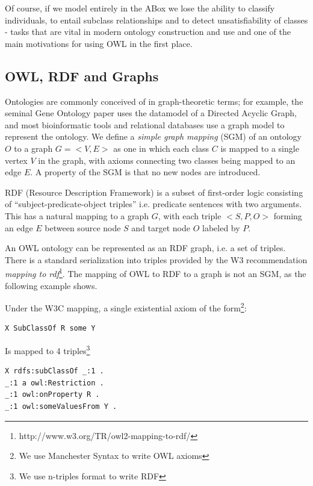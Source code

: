 \documentclass{my}
\begin{document}
Of course, if we model entirely in the ABox we lose the ability to
classify individuals, to entail subclass relationships and to detect
unsatisfiability of classes - tasks that are vital in modern ontology
construction and use and one of the main motivations for using OWL in
the first place.

\subsection{OWL, RDF and Graphs}

Ontologies are commonly conceived of in graph-theoretic terms; for
example, the seminal Gene Ontology paper\cite{Ashburner2000} uses the
datamodel of a Directed Acyclic Graph, and most bioinformatic tools
and relational databases use a graph model to represent the
ontology\cite{Mungall2007}. We define a \emph{simple graph mapping}
(SGM) of an ontology $O$ to a graph $G = <V,E>$ as one in which each
class $C$ is mapped to a single vertex $V$ in the graph, with axioms
connecting two classes being mapped to an edge $E$. A property of the
SGM is that no new nodes are introduced.

RDF (Resource Description Framework) is a subset of first-order logic
consisting of ``subject-predicate-object triples'' i.e. predicate
sentences with two arguments. This has a natural mapping to a graph
$G$, with each triple $<S, P, O>$ forming an edge $E$ between source
node $S$ and target node $O$ labeled by $P$.

An OWL ontology can be represented as an RDF graph, i.e. a set of
triples. There is a standard serialization into triples provided by
the W3 recommendation \emph{mapping to
  rdf}\footnote{http://www.w3.org/TR/owl2-mapping-to-rdf/}. The
mapping of OWL to RDF to a graph is not an SGM, as the following
example shows.

Under the W3C mapping, a single existential axiom of the
form\footnote{We use Manchester Syntax to write OWL axioms}:

\begin{verbatim}
X SubClassOf R some Y
\end{verbatim}

Is mapped to 4 triples\footnote{We use n-triples format to write RDF}

\begin{verbatim}
X rdfs:subClassOf _:1 .
_:1 a owl:Restriction .
_:1 owl:onProperty R .
_:1 owl:someValuesFrom Y .
\end{verbatim}
\end{document}
